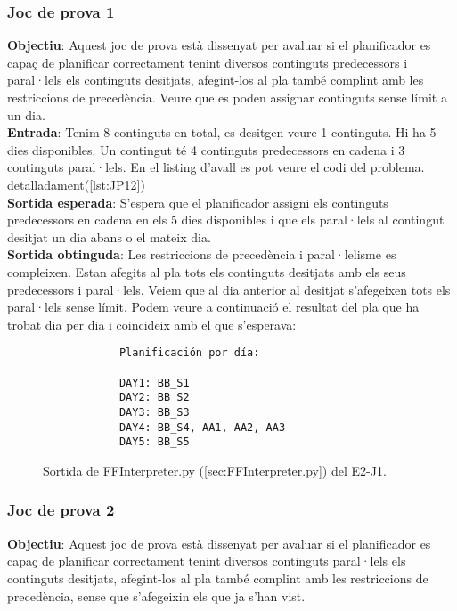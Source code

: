\documentclass[a4paper]{article}
\begin{document}
	\subsubsection*{Joc de prova 1}
	\noindent \textbf{Objectiu}: Aquest joc de prova està dissenyat per avaluar si el planificador es capaç de planificar correctament tenint diversos continguts predecessors i paral·lels els continguts desitjats, afegint-los al pla també complint amb les restriccions de precedència. Veure que es poden assignar continguts sense límit a un dia. \\
	
	\noindent \textbf{Entrada}: Tenim 8 continguts en total, es desitgen veure 1 continguts. Hi ha 5 dies disponibles. Un contingut té 4 continguts predecessors en cadena i 3 continguts paral·lels. En el listing d'avall es pot veure el codi del problema.  detalladament(\ref{lst:JP12}) \\
	
	\noindent \textbf{Sortida esperada}: S'espera que el planificador assigni els continguts predecessors en cadena en els 5 dies disponibles i que els paral·lels al contingut desitjat un dia abans o el mateix dia. \\
	
	\noindent \textbf{Sortida obtinguda}:  Les restriccions de  precedència i paral·lelisme es compleixen.  Estan afegits al pla tots els continguts desitjats amb els seus predecessors i paral·lels. Veiem que al dia anterior al desitjat s'afegeixen tots els paral·lels sense límit. Podem veure a continuació el resultat del pla que ha trobat dia per dia i coincideix amb el que s'esperava:
	
	\begin{figure}[H]
		\centering
		\begin{verbatim}
			Planificación por día:
			
			DAY1: BB_S1
			DAY2: BB_S2
			DAY3: BB_S3
			DAY4: BB_S4, AA1, AA2, AA3
			DAY5: BB_S5
		\end{verbatim}
		\caption{Sortida de FFInterpreter.py (\ref{sec:FFInterpreter.py}) del E2-J1.}
	\end{figure}
	
	\subsubsection*{Joc de prova 2}
	\noindent \textbf{Objectiu}: Aquest joc de prova està dissenyat per avaluar si el planificador es capaç de planificar correctament tenint diversos continguts paral·lels els continguts desitjats, afegint-los al pla també complint amb les restriccions de precedència, sense que s'afegeixin els que ja s'han vist. \\
	
\end{document}
